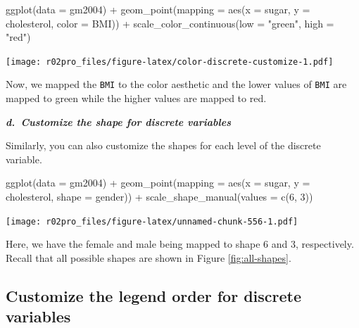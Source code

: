 \documentclass[
]{book}
\newenvironment{Shaded}{\begin{snugshade}}{\end{snugshade}}
\newcommand{\AttributeTok}[1]{\textcolor[rgb]{0.77,0.63,0.00}{#1}}
\newcommand{\DecValTok}[1]{\textcolor[rgb]{0.00,0.00,0.81}{#1}}
\newcommand{\FunctionTok}[1]{\textcolor[rgb]{0.00,0.00,0.00}{#1}}
\newcommand{\NormalTok}[1]{#1}
\newcommand{\SpecialCharTok}[1]{\textcolor[rgb]{0.00,0.00,0.00}{#1}}
\newcommand{\StringTok}[1]{\textcolor[rgb]{0.31,0.60,0.02}{#1}}
\begin{document}
\begin{Shaded}
\begin{Highlighting}[]
\FunctionTok{ggplot}\NormalTok{(}\AttributeTok{data =}\NormalTok{ gm2004) }\SpecialCharTok{+} 
  \FunctionTok{geom\_point}\NormalTok{(}\AttributeTok{mapping =} \FunctionTok{aes}\NormalTok{(}\AttributeTok{x =}\NormalTok{ sugar, }
                           \AttributeTok{y =}\NormalTok{ cholesterol,}
                           \AttributeTok{color =}\NormalTok{ BMI)) }\SpecialCharTok{+} 
  \FunctionTok{scale\_color\_continuous}\NormalTok{(}\AttributeTok{low =} \StringTok{"green"}\NormalTok{, }
                         \AttributeTok{high =} \StringTok{"red"}\NormalTok{)}
\end{Highlighting}
\end{Shaded}

\texttt{[image: r02pro\_files/figure-latex/color-discrete-customize-1.pdf]}

Now, we mapped the \texttt{BMI} to the color aesthetic and the lower values of \texttt{BMI} are mapped to green while the higher values are mapped to red.

\textbf{\emph{d.~Customize the shape for discrete variables}}

Similarly, you can also customize the shapes for each level of the discrete variable.

\begin{Shaded}
\begin{Highlighting}[]
\FunctionTok{ggplot}\NormalTok{(}\AttributeTok{data =}\NormalTok{ gm2004) }\SpecialCharTok{+} 
  \FunctionTok{geom\_point}\NormalTok{(}\AttributeTok{mapping =} \FunctionTok{aes}\NormalTok{(}\AttributeTok{x =}\NormalTok{ sugar, }
                           \AttributeTok{y =}\NormalTok{ cholesterol,}
                           \AttributeTok{shape =}\NormalTok{ gender)) }\SpecialCharTok{+}
  \FunctionTok{scale\_shape\_manual}\NormalTok{(}\AttributeTok{values =} \FunctionTok{c}\NormalTok{(}\DecValTok{6}\NormalTok{, }\DecValTok{3}\NormalTok{))}
\end{Highlighting}
\end{Shaded}

\texttt{[image: r02pro\_files/figure-latex/unnamed-chunk-556-1.pdf]}

Here, we have the female and male being mapped to shape 6 and 3, respectively. Recall that all possible shapes are shown in Figure \ref{fig:all-shapes}.

\hypertarget{customize-the-legend-order-for-discrete-variables}{%
\subsection{Customize the legend order for discrete variables}\label{customize-the-legend-order-for-discrete-variables}}
\end{document}

